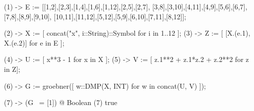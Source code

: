 \begin{axiom}
(1) -> E := [[1,2],[2,3],[1,4],[1,6],[1,12],[2,5],[2,7],
[3,8],[3,10],[4,11],[4,9],[5,6],[6,7],[7,8],[8,9],[9,10],
[10,11],[11,12],[5,12],[5,9],[6,10],[7,11],[8,12]];

(2) -> X := [ concat("x", i::String)::Symbol for i in 1..12 ];
(3) -> Z := [ [X.(e.1), X.(e.2)] for e in E ];

(4) -> U := [ x**3 - 1 for x in X ];
(5) -> V := [ z.1**2 + z.1*z.2 + z.2**2 for z in Z];

(6) -> G := groebner([ w::DMP(X, INT) for w in concat(U, V) ]);

(7) -> (G ~= [1]) @ Boolean
   (7) true
\end{axiom}

